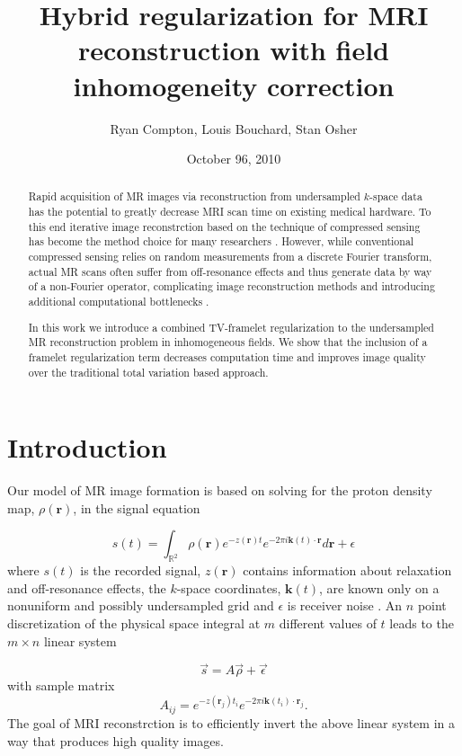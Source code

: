 \documentclass[11pt]{amsart}
\title{Hybrid regularization for MRI reconstruction with field inhomogeneity correction}
\author{Ryan Compton, Louis Bouchard, Stan Osher}
\date{October 96, 2010}
\theoremstyle{remark}
\begin{document}
\begin{abstract}
Rapid acquisition of MR images via reconstruction from undersampled $k$-space data has the potential to greatly decrease MRI scan time on existing medical hardware. To this end iterative image reconstrction based on the technique of compressed sensing has become the method choice for many researchers \cite{Lustig2007}. However, while conventional compressed sensing relies on random measurements from a discrete Fourier transform, actual MR scans often suffer from off-resonance effects and thus generate data by way of a non-Fourier operator, complicating image reconstruction methods and introducing additional computational bottlenecks \cite{Fessler2005}.

In this work we introduce a combined TV-framelet regularization to the undersampled MR reconstruction problem in inhomogeneous fields. We show that the inclusion of a framelet regularization term decreases computation time and improves image quality over the traditional total variation based approach.

\end{abstract}

\maketitle


\section{Introduction}
Our model of MR image formation is based on solving for the proton density map, $\rho(\mathbf{r})$, in the signal equation

\begin{equation}\label{sigeq}
s(t) = \int_{\mathbb{R}^2} \rho(\mathbf{r})e^{-z(\mathbf{r})t}e^{-2\pi i \mathbf{k}(t) \cdot \mathbf{r}} d\mathbf{r} + \epsilon
\end{equation}
where $s(t)$ is the recorded signal, $z(\mathbf{r})$ contains information about relaxation and off-resonance effects, the $k$-space coordinates, $\mathbf{k}(t)$, are known only on a nonuniform and possibly undersampled grid and $\epsilon$ is receiver noise \cite{Haacke1999}. An $n$ point discretization of the physical space integral at $m$ different values of $t$ leads to the $m \times n$ linear system

\begin{equation}\label{dissigeq}
\vec{s} = A \vec{\rho} + \vec{\epsilon}
\end{equation}
with sample matrix
\begin{equation}\label{aij}
A_{ij} = e^{-z(\mathbf{r}_j)t_i}e^{-2\pi i \mathbf{k}(t_i) \cdot \mathbf{r}_j}.
\end{equation}
The goal of MRI reconstrction is to efficiently invert the above linear system in a way that produces high quality images.
\end{document}
